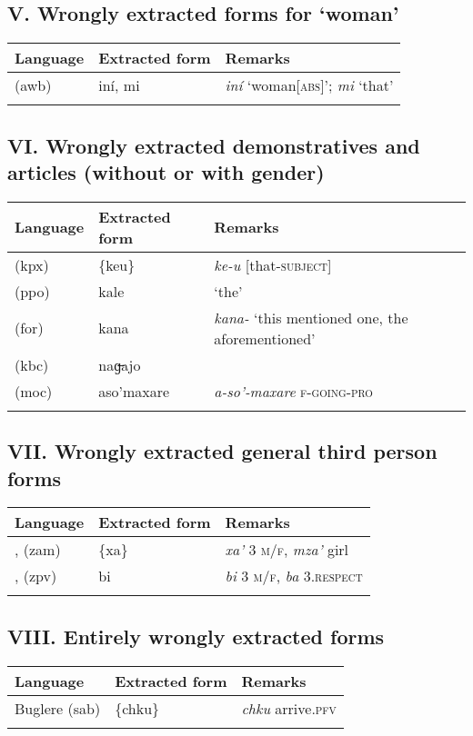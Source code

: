 \subsection*{V. Wrongly extracted forms for ‘woman’ \normalfont [1 language]}

\begin{tabularx}{\textwidth}{llQ}
\lsptoprule
 Language &  Extracted form &  Remarks \\
\midrule
{} (awb)	 & {iní, mi}	 & \textit{iní} ‘woman[\textsc{abs}]’; \textit{mi} ‘that’\\
\lspbottomrule
\end{tabularx}


\subsection*{VI. Wrongly extracted demonstratives and articles (without or with gender)
\normalfont [5 languages]}

\begin{tabularx}{\textwidth}{llQ}
\lsptoprule
 Language &  Extracted form &  Remarks \\
\midrule
{} (kpx)	&	\{keu\}	&	\textit{ke-u} [that-\textsc{subject}]	\\
 (ppo)	&	kale	&	‘the’	\\
 (for)	&	kana	&	\textit{kana-} ‘this mentioned one, the aforementioned’	\\
 (kbc)	&	naɡ̶ajo	&		\\
 (moc)	&	aso’maxare	&	\textit{a-so’-maxare} \textsc{f-going-pro}	\\
\lspbottomrule
\end{tabularx}


\subsection*{VII. Wrongly extracted general third person forms \normalfont [2 languages]}

\begin{tabularx}{\textwidth}{llQ}
\lsptoprule
 Language &  Extracted form &  Remarks \\
\midrule
{},  (zam)	&	\{xa\textquotesingle{}\}	&	\textit{xa’} 3 \textsc{m/f}, \textit{mza’} girl	\\
,  (zpv)	&	bi	&	\textit{bi} 3 \textsc{m/f}, \textit{ba} 3.\textsc{respect}	\\
\lspbottomrule
\end{tabularx}


\subsection*{VIII. Entirely wrongly extracted forms}

\begin{tabularx}{\textwidth}{llQ}
\lsptoprule
 Language &  Extracted form &  Remarks \\
\midrule
Buglere (sab)	& \{chku\}	& \textit{chku} arrive.\textsc{pfv}\\
\lspbottomrule
\end{tabularx}
